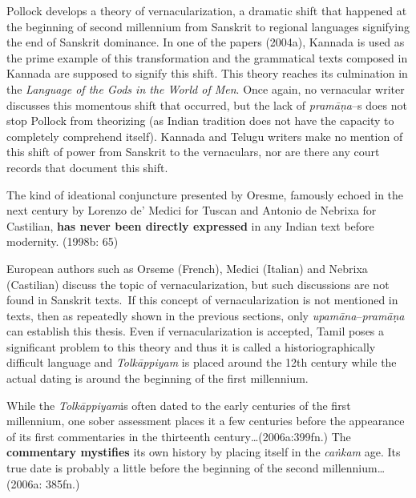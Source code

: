 Pollock develops a theory of vernacularization, a dramatic shift that happened at the beginning of second millennium from Sanskrit to regional languages signifying the end of Sanskrit dominance. In one of the papers (2004a), Kannada is used as the prime example of this transformation and the grammatical texts composed in Kannada are supposed to signify this shift. This theory reaches its culmination in the \textit{Language of the Gods in the World of Men}. Once again, no vernacular writer discusses this momentous shift that occurred, but the lack of \textit{pramāṇa}–s does not stop Pollock from theorizing (as Indian tradition does not have the capacity to completely comprehend itself). Kannada and Telugu writers make no mention of this shift of power from Sanskrit to the vernaculars, nor are there any court records that document this shift.

\begin{myquote}
The kind of ideational conjuncture presented by Oresme, famously echoed in the next century by Lorenzo de’ Medici for Tuscan and Antonio de Nebrixa for Castilian, \textbf{has never been directly expressed} in any Indian text before modernity. (1998b: 65)
\end{myquote}

European authors such as Orseme (French), Medici (Italian) and Nebrixa (Castilian) discuss the topic of vernacularization, but such discussions are not found in Sanskrit texts.~If this concept of vernacularization is not mentioned in texts, then as repeatedly shown in the previous sections, only \textit{upamāna}–\textit{pramāṇa} can establish this thesis. Even if vernacularization is accepted, Tamil poses a significant problem to this theory and thus it is called a historiographically difficult language and \textit{Tolkāppiyam} is placed around the 12th century while the actual dating is around the beginning of the first millennium.

\begin{myquote}
While the \textit{Tolkāppiyam}is often dated to the early centuries of the first millennium, one sober assessment places it a few centuries before the appearance of its first commentaries in the thirteenth century…(2006a:399fn.) The \textbf{commentary mystifies} its own history by placing itself in the \textit{caṅkam} age. Its true date is probably a little before the beginning of the second millennium…(2006a: 385fn.)
\end{myquote}

